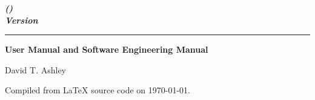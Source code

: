 \thispagestyle{empty}

\begin{flushright}
\vspace*{0mm}
\Huge\bfseries
\emph{\productbasenamelong{} (\productbasenameshort{})}\\
\emph{Version \productversion{}}\\
\end{flushright}
\vspace{0.0cm}
\noindent\rule{\textwidth}{2pt}
\begin{flushright}
\huge\bfseries
User Manual and Software Engineering Manual
\end{flushright}
\vfill
\begin{flushright}
\begin{small}
David T. Ashley
\end{small}
\end{flushright}
\vspace{0.2cm}
\begin{flushright}
\begin{small}
Compiled from \LaTeX{} source code on \today .  
\end{small}
\end{flushright}


